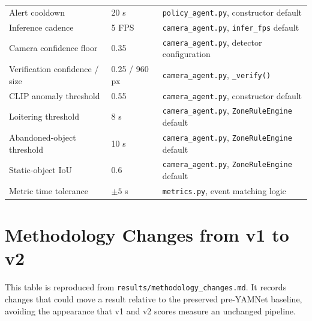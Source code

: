 \begin{longtable}{p{3.7cm}p{2.1cm}p{5.9cm}}
Alert cooldown & 20 s & \texttt{policy\_agent.py}, constructor default \\
Inference cadence & 5 FPS & \texttt{camera\_agent.py}, \texttt{infer\_fps} default \\
Camera confidence floor & 0.35 & \texttt{camera\_agent.py}, detector configuration \\
Verification confidence / size & 0.25 / 960 px & \texttt{camera\_agent.py}, \texttt{\_verify()} \\
CLIP anomaly threshold & 0.55 & \texttt{camera\_agent.py}, constructor default \\
Loitering threshold & 8 s & \texttt{camera\_agent.py}, \texttt{ZoneRuleEngine} default \\
Abandoned-object threshold & 10 s & \texttt{camera\_agent.py}, \texttt{ZoneRuleEngine} default \\
Static-object IoU & 0.6 & \texttt{camera\_agent.py}, \texttt{ZoneRuleEngine} default \\
Metric time tolerance & $\pm5$ s & \texttt{metrics.py}, event matching logic \\
\bottomrule
\end{longtable}
\normalsize

\chapter{Methodology Changes from v1 to v2}
\label{app:methodology}

This table is reproduced from \texttt{results/methodology\_changes.md}. It
records changes that could move a result relative to the preserved pre-YAMNet
baseline, avoiding the appearance that v1 and v2 scores measure an unchanged
pipeline.

